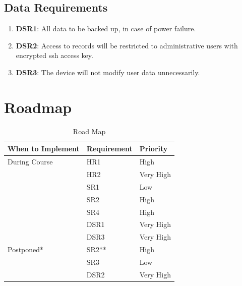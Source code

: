 \documentclass{article}
\begin{document}
\subsection{Data Requirements }
\begin{enumerate}
	\item\label{DSR1}\textbf{DSR1}: All data to be backed up, in case of power failure.\\
	\item\label{DSR2}\textbf{DSR2}: 	Access to records will be restricted to administrative users with encrypted ssh access key.\\
	\item\label{DSR3}\textbf{DSR3}: 	The device will not modify user data unnecessarily.\\ 	
\end{enumerate}


\pagebreak
\section{Roadmap}
\begin{table}[H]
	\caption{Road Map} \label{RoadMap}
	\begin{tabularx}{\textwidth}{llX}
		\toprule
		\textbf{When to Implement} & \textbf{Requirement} & \textbf{Priority}        \\
		\midrule
		During Course         	& HR1               	& High			\\
		         			& HR2              		& Very High 				\\
		          			& SR1                   	& Low                   	     \\
		          			& SR2     			& High                   	     \\
		          			& SR4                   	& High                   	     \\
		          			& DSR1                  	& Very High                   	     \\
		          			& DSR3                   & Very High                   	     \\
		Postponed*		& SR2** 			& High                               \\
						& SR3 			& Low                               \\
						& DSR2 			& Very High                               \\
		\bottomrule
	\end{tabularx}
\end{table}
\end{document}
